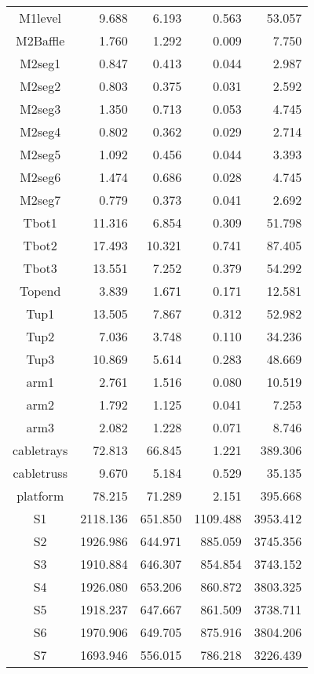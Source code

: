 \begin{longtable}{crrrr}
 M1level & 9.688 & 6.193 & 0.563 & 53.057 \\
 M2Baffle & 1.760 & 1.292 & 0.009 & 7.750 \\
 M2seg1 & 0.847 & 0.413 & 0.044 & 2.987 \\
 M2seg2 & 0.803 & 0.375 & 0.031 & 2.592 \\
 M2seg3 & 1.350 & 0.713 & 0.053 & 4.745 \\
 M2seg4 & 0.802 & 0.362 & 0.029 & 2.714 \\
 M2seg5 & 1.092 & 0.456 & 0.044 & 3.393 \\
 M2seg6 & 1.474 & 0.686 & 0.028 & 4.745 \\
 M2seg7 & 0.779 & 0.373 & 0.041 & 2.692 \\
 Tbot1 & 11.316 & 6.854 & 0.309 & 51.798 \\
 Tbot2 & 17.493 & 10.321 & 0.741 & 87.405 \\
 Tbot3 & 13.551 & 7.252 & 0.379 & 54.292 \\
 Topend & 3.839 & 1.671 & 0.171 & 12.581 \\
 Tup1 & 13.505 & 7.867 & 0.312 & 52.982 \\
 Tup2 & 7.036 & 3.748 & 0.110 & 34.236 \\
 Tup3 & 10.869 & 5.614 & 0.283 & 48.669 \\
 arm1 & 2.761 & 1.516 & 0.080 & 10.519 \\
 arm2 & 1.792 & 1.125 & 0.041 & 7.253 \\
 arm3 & 2.082 & 1.228 & 0.071 & 8.746 \\
 cabletrays & 72.813 & 66.845 & 1.221 & 389.306 \\
 cabletruss & 9.670 & 5.184 & 0.529 & 35.135 \\
 platform & 78.215 & 71.289 & 2.151 & 395.668 \\
 S1 & 2118.136 & 651.850 & 1109.488 & 3953.412 \\
 S2 & 1926.986 & 644.971 & 885.059 & 3745.356 \\
 S3 & 1910.884 & 646.307 & 854.854 & 3743.152 \\
 S4 & 1926.080 & 653.206 & 860.872 & 3803.325 \\
 S5 & 1918.237 & 647.667 & 861.509 & 3738.711 \\
 S6 & 1970.906 & 649.705 & 875.916 & 3804.206 \\
 S7 & 1693.946 & 556.015 & 786.218 & 3226.439 \\
\bottomrule
\end{longtable}


